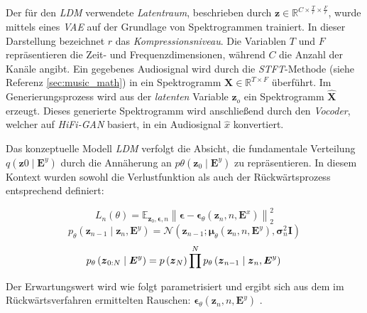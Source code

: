 \documentclass[
  a4paper,  %
  twoside,  %
  bibliography=totoc,
  headsepline,
  cleardoublepage=empty,
  parskip=half,
  draft=false
]{scrbook}
\begin{document}
{Der für den \emph{LDM} verwendete \emph{Latentraum}, beschrieben durch $\boldsymbol{z} \in \mathbb{R}^{C \times \frac{T}{r} \times \frac{F}{r}}$, wurde mittels eines \emph{VAE} auf der Grundlage von Spektrogrammen trainiert. In dieser Darstellung bezeichnet $r$ das \emph{Kompressionsniveau}. Die Variablen $T$ und $F$ repräsentieren die Zeit- und Frequenzdimensionen, während $C$ die Anzahl der Kanäle angibt. Ein gegebenes Audiosignal wird durch die \emph{STFT}-Methode (siehe Referenz \ref{sec:music_math}) in ein Spektrogramm $\boldsymbol{X} \in \mathbb{R}^{T \times F}$ überführt. Im Generierungsprozess wird aus der \emph{latenten} Variable $\hat{\boldsymbol{z}}_o$ ein Spektrogramm $\hat{\boldsymbol{X}}$ erzeugt. Dieses generierte Spektrogramm wird anschließend durch den \emph{Vocoder}, welcher auf \emph{HiFi-GAN} \cite{kong_hifi-gan_2020} basiert, in ein Audiosignal $\hat{x}$ konvertiert. \cite{liu_audioldm_2023}

Das konzeptuelle Modell \emph{LDM} verfolgt die Absicht, die fundamentale Verteilung $q\left(\boldsymbol{z}0 \mid \boldsymbol{E}^y\right)$ durch die Annäherung an $p\theta\left(\boldsymbol{z}_0 \mid \boldsymbol{E}^y\right)$ zu repräsentieren. In diesem Kontext wurden sowohl die Verlustfunktion als auch der Rückwärtsprozess entsprechend definiert: \cite{liu_audioldm_2023}

\begin{equation}
    L_n(\theta)=\mathbb{E}_{\boldsymbol{z}_0, \boldsymbol{\epsilon}, n}\left\|\boldsymbol{\epsilon}-\boldsymbol{\epsilon}_\theta\left(\boldsymbol{z}_n, n, \boldsymbol{E}^x\right)\right\|_2^2
\end{equation}
\begin{equation}
    p_\theta\left(\boldsymbol{z}_{n-1} \mid \boldsymbol{z}_n, \boldsymbol{E}^y\right)=\mathcal{N}\left(\boldsymbol{z}_{n-1} ; \boldsymbol{\mu}_\theta\left(\boldsymbol{z}_n, n, \boldsymbol{E}^y\right), \boldsymbol{\sigma}_n^2 \boldsymbol{I}\right)
\end{equation}
\begin{equation}
    p_\theta\left(\boldsymbol{z}_{0: N} \mid \boldsymbol{E}^y\right)=p\left(\boldsymbol{z}_N\right) \prod^N p_\theta\left(\boldsymbol{z}_{n-1} \mid \boldsymbol{z}_n, \boldsymbol{E}^y\right) \\
\end{equation}

Der Erwartungswert wird wie folgt parametrisiert und ergibt sich aus dem im Rückwärtsverfahren ermittelten Rauschen: $\boldsymbol{\epsilon}_\theta\left(\boldsymbol{z}_n, n, \boldsymbol{E}^y\right)$ \cite{liu_audioldm_2023}.

}
\end{document}
